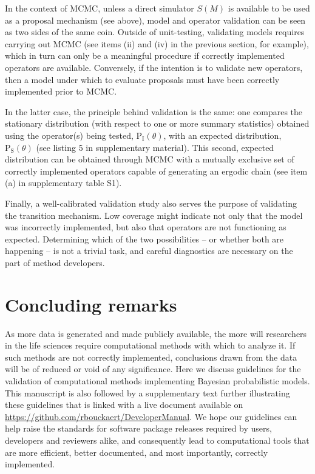\documentclass[oneside]{article}
\begin{document}
In the context of MCMC, unless a direct simulator $S(M)$ is
available to be used as a proposal mechanism (see above), model and operator
validation can be seen as two sides of the same coin.
Outside of unit-testing, validating models requires carrying out MCMC
(see items (ii) and (iv) in the previous section, for example), which
in turn can only be a meaningful procedure if correctly implemented
operators are available.
Conversely, if the intention is to validate new operators, then a
model under which to evaluate proposals must have been correctly
implemented prior to MCMC.

In the latter case, the principle behind validation is the same: one
compares the stationary distribution (with respect to one or more summary
statistics) obtained using the operator(s)
being tested, $\text{P}_{\text{I}}(\theta)$, with an expected
distribution, $\text{P}_{\text{S}}(\theta)$ (see listing 5 in
supplementary material). 
This second, expected distribution can be obtained through MCMC with a
mutually exclusive set of correctly implemented operators capable of
generating an ergodic chain (see item
(a) in supplementary table S1). 

Finally, a well-calibrated validation study also serves the purpose of
validating the transition mechanism.
Low coverage might indicate not only that the model was incorrectly
implemented, but also that operators are not functioning as expected.
Determining which of the two possibilities -- or whether both are
happening -- is not a trivial task, and careful diagnostics are
necessary on the part of method developers.

\section*{Concluding remarks}

As more data is generated and made publicly available, the more will
researchers in the life sciences require computational methods with
which to analyze it.
If such methods are not correctly implemented, conclusions drawn from
the data will be of reduced or void of any significance.
Here we discuss guidelines for the validation of computational methods
implementing Bayesian probabilistic models.
This manuscript is also followed by a supplementary text further
illustrating these guidelines that is linked with a live document
available on \href{https://github.com/rbouckaert/DeveloperManual}{https://github.com/rbouckaert/DeveloperManual}.
We hope our guidelines can help raise the standards for software
package releases required by users, developers and reviewers alike,
and consequently lead to computational tools that are more efficient,
better documented, and most importantly, correctly implemented.
\end{document}
